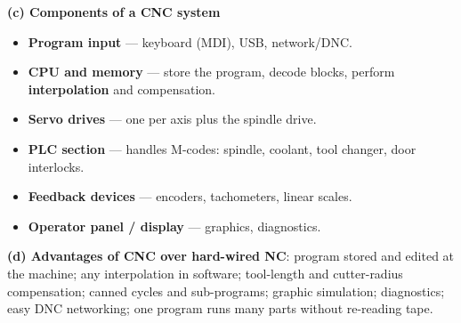 \documentclass[11pt,a4paper]{article}
\begin{document}
\begin{enumerate}
\begin{answer}
			\textbf{(c) Components of a CNC system}
			\begin{itemize}[itemsep=1pt]
				\item \textbf{Program input} --- keyboard (MDI), USB, network/DNC.
				\item \textbf{CPU and memory} --- store the program, decode blocks, perform \textbf{interpolation} and compensation.
				\item \textbf{Servo drives} --- one per axis plus the spindle drive.
				\item \textbf{PLC section} --- handles M-codes: spindle, coolant, tool changer, door interlocks.
				\item \textbf{Feedback devices} --- encoders, tachometers, linear scales.
				\item \textbf{Operator panel / display} --- graphics, diagnostics.
			\end{itemize}

			\textbf{(d) Advantages of CNC over hard-wired NC}: program stored and edited at the machine; any interpolation in software; tool-length and cutter-radius compensation; canned cycles and sub-programs; graphic simulation; diagnostics; easy DNC networking; one program runs many parts without re-reading tape.
		\end{answer}


\end{enumerate}
\end{document}
